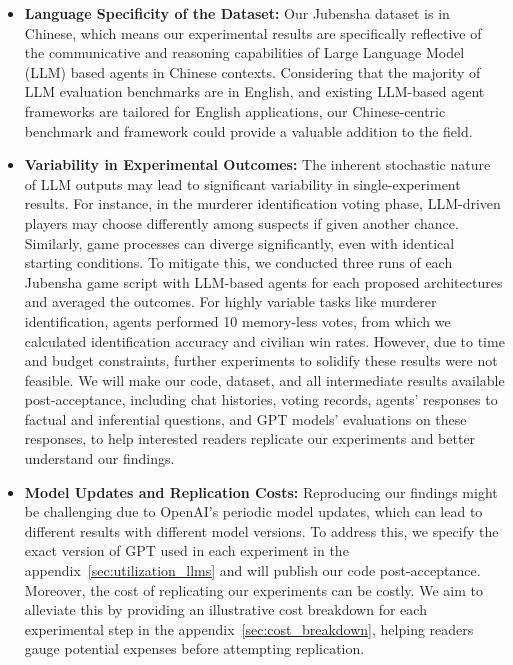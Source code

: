 \documentclass[11pt]{article}
\begin{document}
\begin{itemize}
    \item \textbf{Language Specificity of the Dataset:} Our Jubensha dataset is in Chinese, which means our experimental results are specifically reflective of the communicative and reasoning capabilities of Large Language Model (LLM) based agents in Chinese contexts. Considering that the majority of LLM evaluation benchmarks are in English, and existing LLM-based agent frameworks are tailored for English applications, our Chinese-centric benchmark and framework could provide a valuable addition to the field.
    
    \item \textbf{Variability in Experimental Outcomes:} The inherent stochastic nature of LLM outputs may lead to significant variability in single-experiment results. For instance, in the murderer identification voting phase, LLM-driven players may choose differently among suspects if given another chance. Similarly, game processes can diverge significantly, even with identical starting conditions. To mitigate this, we conducted three runs of each Jubensha game script with LLM-based agents for each proposed architectures and averaged the outcomes. For highly variable tasks like murderer identification, agents performed 10 memory-less votes, from which we calculated identification accuracy and civilian win rates. However, due to time and budget constraints, further experiments to solidify these results were not feasible. We will make our code, dataset, and all intermediate results available post-acceptance, including chat histories, voting records, agents' responses to factual and inferential questions, and GPT models' evaluations on these responses, to help interested readers replicate our experiments and better understand our findings.
    
\item \textbf{Model Updates and Replication Costs:} Reproducing our findings might be challenging due to OpenAI's periodic model updates, which can lead to different results with different model versions. To address this, we specify the exact version of GPT used in each experiment in the appendix~\ref{sec:utilization_llms} and will publish our code post-acceptance. Moreover, the cost of replicating our experiments can be costly. We aim to alleviate this by providing an illustrative cost breakdown for each experimental step in the appendix~\ref{sec:cost_breakdown}, helping readers gauge potential expenses before attempting replication.
\end{itemize}
\end{document}
